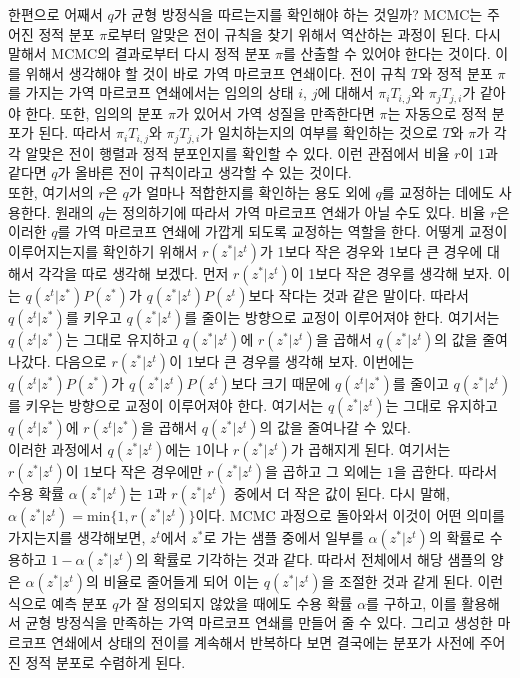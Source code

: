 \documentclass[a4paper]{oblivoir}
\begin{document}
한편으로 어째서 $q$가 균형 방정식을 따르는지를 확인해야 하는 것일까? MCMC는 주어진 정적 분포 $\pi$로부터 알맞은 전이 규칙을 찾기 위해서 역산하는 과정이 된다. 다시 말해서 MCMC의 결과로부터 다시 정적 분포 $\pi$를 산출할 수 있어야 한다는 것이다. 이를 위해서 생각해야 할 것이 바로 가역 마르코프 연쇄이다. 전이 규칙 $T$와 정적 분포 $\pi$를 가지는 가역 마르코프 연쇄에서는 임의의 상태 $i$, $j$에 대해서 $\pi_{i}T_{i,j}$와 $\pi_{j}T_{j,i}$가 같아야 한다. 또한, 임의의 분포 $\pi$가 있어서 가역 성질을 만족한다면 $\pi$는 자동으로 정적 분포가 된다. 따라서 $\pi_{i}T_{i,j}$와 $\pi_{j}T_{j,i}$가 일치하는지의 여부를 확인하는 것으로 $T$와 $\pi$가 각각 알맞은 전이 행렬과 정적 분포인지를 확인할 수 있다. 이런 관점에서 비율 $r$이 1과 같다면 $q$가 올바른 전이 규칙이라고 생각할 수 있는 것이다. \\

또한, 여기서의 $r$은 $q$가 얼마나 적합한지를 확인하는 용도 외에 $q$를 교정하는 데에도 사용한다. 원래의 $q$는 정의하기에 따라서 가역 마르코프 연쇄가 아닐 수도 있다. 비율 $r$은 이러한 $q$를 가역 마르코프 연쇄에 가깝게 되도록 교정하는 역할을 한다. 어떻게 교정이 이루어지는지를 확인하기 위해서 $r(z^{*}|z^{t})$가 1보다 작은 경우와 1보다 큰 경우에 대해서 각각을 따로 생각해 보겠다. 먼저 $r(z^{*}|z^{t})$이 1보다 작은 경우를 생각해 보자. 이는 $q(z^{t}|z^{*})P(z^{*})$가 $q(z^{*}|z^{t})P(z^{t})$보다 작다는 것과 같은 말이다. 따라서 $q(z^{t}|z^{*})$를 키우고 $q(z^{*}|z^{t})$를 줄이는 방향으로 교정이 이루어져야 한다. 여기서는 $q(z^{t}|z^{*})$는 그대로 유지하고 $q(z^{*}|z^{t})$에 $r(z^{*}|z^{t})$을 곱해서 $q(z^{*}|z^{t})$의 값을 줄여나갔다. 다음으로 $r(z^{*}|z^{t})$이 1보다 큰 경우를 생각해 보자. 이번에는 $q(z^{t}|z^{*})P(z^{*})$가 $q(z^{*}|z^{t})P(z^{t})$보다 크기 때문에 $q(z^{t}|z^{*})$를 줄이고 $q(z^{*}|z^{t})$를 키우는 방향으로 교정이 이루어져야 한다. 여기서는 $q(z^{*}|z^{t})$는 그대로 유지하고 $q(z^{t}|z^{*})$에 $r(z^{t}|z^{*})$을 곱해서 $q(z^{*}|z^{t})$의 값을 줄여나갈 수 있다. \\

이러한 과정에서 $q(z^{*}|z^{t})$에는 $1$이나 $r(z^{*}|z^{t})$가 곱해지게 된다. 여기서는 $r(z^{*}|z^{t})$이 1보다 작은 경우에만 $r(z^{*}|z^{t})$을 곱하고 그 외에는 $1$을 곱한다. 따라서 수용 확률 $\alpha(z^{*}|z^{t})$는 $1$과 $r(z^{*}|z^{t})$ 중에서 더 작은 값이 된다. 다시 말해, $\alpha(z^{*}|z^{t})=\textrm{min} \{ 1, r(z^{*}|z^{t}) \}$이다. MCMC 과정으로 돌아와서 이것이 어떤 의미를 가지는지를 생각해보면, $z^{t}$에서 $z^{*}$로 가는 샘플 중에서 일부를 $\alpha(z^{*}|z^{t})$의 확률로 수용하고 $1-\alpha(z^{*}|z^{t})$의 확률로 기각하는 것과 같다. 따라서 전체에서 해당 샘플의 양은 $\alpha(z^{*}|z^{t})$의 비율로 줄어들게 되어 이는 $q(z^{*}|z^{t})$을 조절한 것과 같게 된다. 이런 식으로 예측 분포 $q$가 잘 정의되지 않았을 때에도 수용 확률 $\alpha$를 구하고, 이를 활용해서 균형 방정식을 만족하는 가역 마르코프 연쇄를 만들어 줄 수 있다. 그리고 생성한 마르코프 연쇄에서 상태의 전이를 계속해서 반복하다 보면 결국에는 분포가 사전에 주어진 정적 분포로 수렴하게 된다. \\
\end{document}
